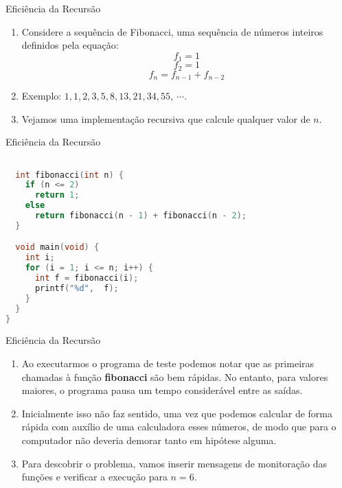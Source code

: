 \begin{frame}[fragile]{Eficiência da Recursão}
\begin{enumerate}
	\item Considere a sequência de Fibonacci, uma sequência de números inteiros definidos pela equação:
	$$f_1 = 1$$
	$$f_2 = 1$$
	$$f_n = f_{n - 1} + f_{n - 2}$$
	\item Exemplo: $1,1,2,3,5,8,13,21,34,55, \ \cdots$.
	\item Vejamos uma implementação recursiva que calcule qualquer valor de $n$.	
\end{enumerate}
\end{frame}

\begin{frame}[fragile]{Eficiência da Recursão}
\begin{lstlisting}[language=C]

  int fibonacci(int n) {				
    if (n <= 2)
      return 1;
    else
      return fibonacci(n - 1) + fibonacci(n - 2);		
  }

  void main(void) {
    int i;
    for (i = 1; i <= n; i++) {
      int f = fibonacci(i);
      printf("%d",  f);
    }
  }
}
\end{lstlisting}
\end{frame}

\begin{frame}[fragile]{Eficiência da Recursão}

\begin{enumerate}
	\item Ao executarmos o programa de teste podemos notar que as primeiras chamadas à função \textbf{fibonacci} são bem rápidas. No entanto, para valores maiores, o programa pausa um tempo considerável entre as saídas.
	\item Inicialmente isso não faz sentido, uma vez que podemos calcular de forma rápida com auxílio de uma calculadora esses números, de modo que para o computador não deveria demorar tanto em hipótese alguma.
	\item Para descobrir o problema, vamos inserir mensagens de monitoração das funções e verificar a execução para $n = 6$.
\end{enumerate}
\end{frame}


